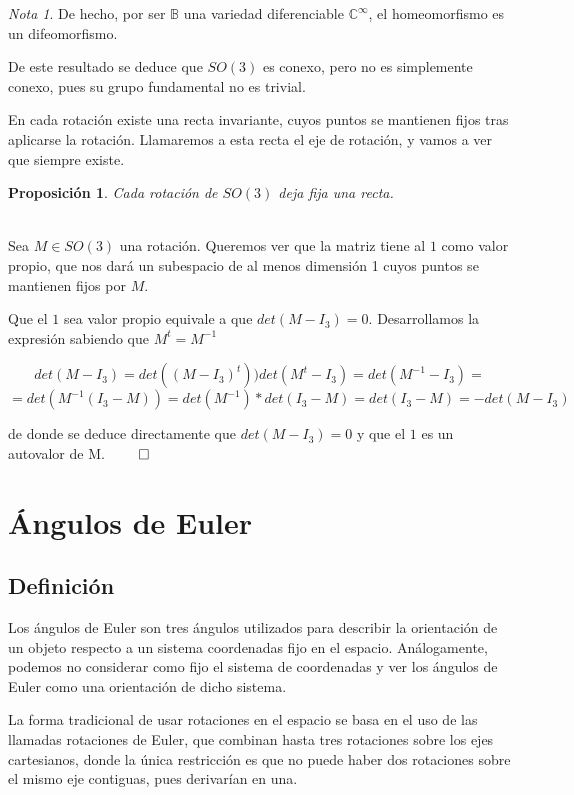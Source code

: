 \documentclass{article}
\theoremstyle{plain}
\newtheorem{proposition}{Proposición}
\theoremstyle{definition}
\theoremstyle{remark}
\newtheorem*{remark}{Nota}
\begin{document}
\begin{remark}
	De hecho, por ser $\mathbb B$ una variedad diferenciable $\mathbb{C^{\infty}}$, el homeomorfismo es un difeomorfismo.
\end{remark}

De este resultado se deduce que $SO(3)$ es conexo, pero no es simplemente conexo, pues su grupo fundamental no es trivial.



En cada rotación existe una recta invariante, cuyos puntos se mantienen fijos tras aplicarse la rotación.
Llamaremos a esta recta el eje de rotación, y vamos a ver que siempre existe.


\begin{proposition}
	Cada rotación de $SO(3)$ deja fija una recta.
\end{proposition}

\begin{proofname}\\
	Sea $ M \in SO(3)$ una rotación. Queremos ver que la matriz tiene al $1$ como valor propio, que nos dará un subespacio
	de al menos dimensión 1 cuyos puntos se mantienen fijos por $M$.

	Que el $1$ sea valor propio equivale a que $ det(M - I_3) = 0$. Desarrollamos la expresión sabiendo que $M^t = M^{-1}$

	\[ det(M - I_3) = det((M - I_3)^t) ) det(M^t - I_3) = det(M^{-1} - I_3) = \]
	\[= det(M^{-1}(I_3 - M)) = det(M^{-1}) * det(I_3 - M) = det(I_3 - M) = -det(M - I_3) \]

	de donde se deduce directamente que $det(M - I_3) = 0$ y que el $1$ es un autovalor de M. $\qed$
\end{proofname}


\section{Ángulos de Euler}
\subsection{Definición}

Los ángulos de Euler son tres ángulos utilizados para describir la
orientación de un objeto respecto a un sistema coordenadas fijo en el
espacio. Análogamente, podemos no considerar como fijo el sistema de
coordenadas y ver los ángulos de Euler como una orientación de dicho
sistema.

La forma tradicional de usar rotaciones en el espacio se basa en el
uso de las llamadas rotaciones de Euler, que combinan hasta tres
rotaciones sobre los ejes cartesianos, donde la única restricción es
que no puede haber dos rotaciones sobre el mismo eje contiguas, pues
derivarían en una.
\end{document}
